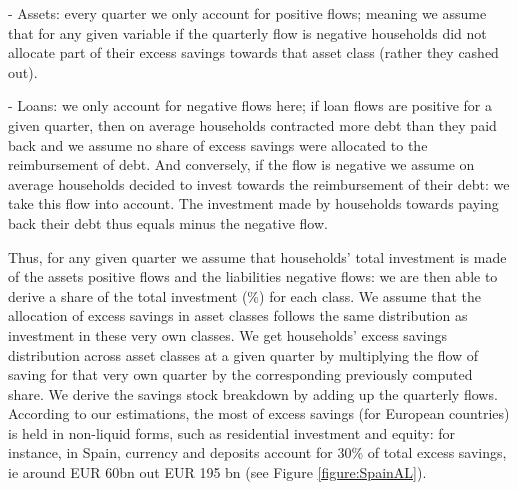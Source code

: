 - Assets: every quarter we only account for positive flows; meaning we assume that for any given variable if the quarterly flow is negative households did not allocate part of their excess savings towards that asset class (rather they cashed out).

- Loans: we only account for negative flows here; if loan flows are positive for a given quarter, then on average households contracted more debt than they paid back and we assume no share of excess savings were allocated to the reimbursement of debt. 
And conversely, if the flow is negative we assume on average households decided to invest towards the reimbursement of their debt: we take this flow into account. The investment made by households towards paying back their debt thus equals minus the negative flow. 

Thus, for any given quarter we assume that households' total investment is made of the assets positive flows and the liabilities negative flows: we are then able to derive a share of the total investment (\%) for each class. 
We assume that the allocation of excess savings in asset classes follows the same distribution as investment in these very own classes. 
We get households' excess savings distribution across asset classes at a given quarter by multiplying the flow of saving for that very own quarter by the corresponding previously computed share. 
We derive the savings stock breakdown by adding up the quarterly flows. According to our estimations, the most of excess savings (for European countries) is held in non-liquid forms, such as residential investment and equity: for instance, in Spain, currency and deposits account for 30\% of total excess savings, ie around EUR 60bn out EUR 195 bn (see Figure \ref{figure:SpainAL}). 

